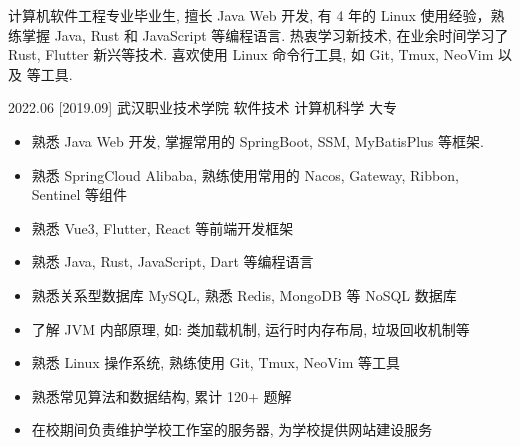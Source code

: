 \documentclass[zh]{resume}
\begin{document}
\makeheader

{\onehalfspacing\hspace{2em}%
	计算机软件工程专业毕业生, 擅长 Java Web 开发,
	有 4 年的 Linux 使用经验，熟练掌握 Java, Rust 和 JavaScript 等编程语言.
	热衷学习新技术, 在业余时间学习了 Rust, Flutter 新兴等技术.
	喜欢使用 Linux 命令行工具, 如 Git, Tmux, NeoVim
	以及  等工具.
	\par}

\begin{competences}
\end{competences}

\begin{educations}
	\education%
	{2022.06}%
	[2019.09]%
	{武汉职业技术学院}%
	{软件技术}%
	{计算机科学}%
	{大专}
\end{educations}

\begin{itemize}
	\item 熟悉 Java Web 开发, 掌握常用的 SpringBoot, SSM, MyBatisPlus 等框架.
	\item 熟悉 SpringCloud Alibaba, 熟练使用常用的 Nacos, Gateway, Ribbon, Sentinel 等组件
	\item 熟悉 Vue3, Flutter, React 等前端开发框架
	\item 熟悉 Java, Rust, JavaScript, Dart 等编程语言
	\item 熟悉关系型数据库 MySQL, 熟悉 Redis, MongoDB 等 NoSQL 数据库
	\item 了解 JVM 内部原理, 如: 类加载机制, 运行时内存布局, 垃圾回收机制等
	\item 熟悉 Linux 操作系统, 熟练使用 Git, Tmux, NeoVim 等工具
	\item 熟悉常见算法和数据结构,  累计 120+ 题解
	\item 在校期间负责维护学校工作室的服务器, 为学校提供网站建设服务
\end{itemize}
\end{document}
